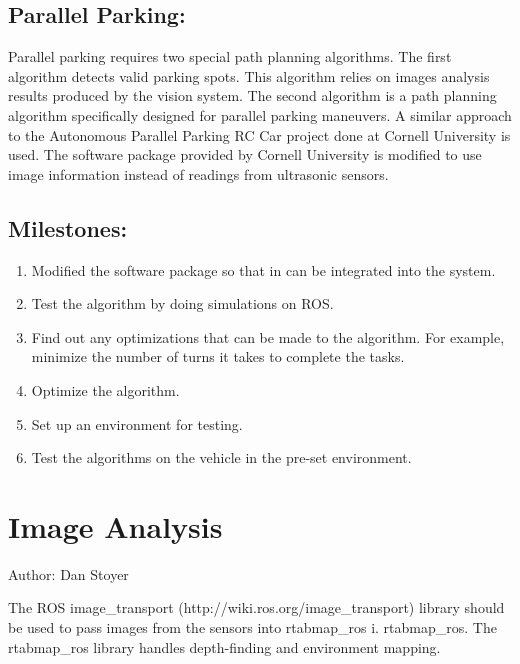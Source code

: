 \documentclass[compsoc,draftclsnofoot,onecolumn,10pt]{IEEEtran}
\begin{document}
\subsection{Parallel Parking:}
Parallel parking requires two special path planning algorithms. The first algorithm detects valid parking spots. This algorithm relies on images analysis results produced by the vision system. The second algorithm is a path planning algorithm specifically designed for parallel parking maneuvers. A similar approach to the Autonomous Parallel Parking RC Car project done at Cornell University is used. The software package provided by Cornell University is modified to use image information instead of readings from ultrasonic sensors.\par
\subsection{Milestones:}
\begin{enumerate}
	\item Modified the software package so that in can be integrated into the system.
	\item Test the algorithm by doing simulations on ROS.
	\item Find out any optimizations that can be made to the algorithm. For example, minimize the number of turns it takes to complete the tasks.
	\item Optimize the algorithm.
	\item Set up an environment for testing.
	\item Test the algorithms on the vehicle in the pre-set environment.
\end{enumerate}

\section{Image Analysis}
Author: Dan Stoyer\par
The ROS image\_transport (http://wiki.ros.org/image\_transport) library should
be used to pass images from the sensors into rtabmap\_ros i. rtabmap\_ros. The
rtabmap\_ros library handles depth-finding and environment mapping. 
\end{document}
